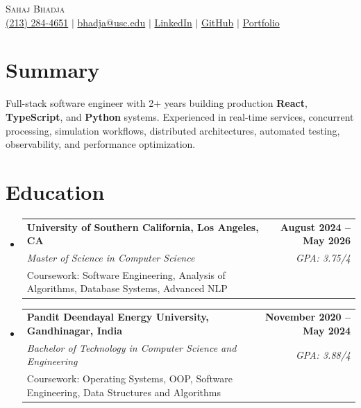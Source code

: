 \documentclass[letterpaper,10pt]{article}
\makeatletter
\newcommand{\resumeEduSubheading}[5]{\vspace{-1pt}\item\begin{tabular*}{1.0\textwidth}[t]{l@{\extracolsep{\fill}}r}\textbf{#1} & \textbf{\small #2} \\\textit{\small #3} & \textit{\small #4} \\\small #5 & \\\end{tabular*}\vspace{-4pt}}
\newcommand{\resumeSubHeadingListStart}{\begin{itemize}[leftmargin=0.0in,label={}]}
\newcommand{\resumeSubHeadingListEnd}{\end{itemize}}
\makeatother
\begin{document}
\begin{center}
  {\Huge \scshape Sahaj Bhadja} \\ \vspace{1pt}
  \small \href{tel:2132844651}{(213) 284-4651} $|$ \href{mailto:bhadja@usc.edu}{bhadja@usc.edu} $|$
  \href{https://www.linkedin.com/in/sahaj-bhadja/}{LinkedIn} $|$ \href{https://github.com/sahaj-bhadja}{GitHub} $|$ \href{https://sahaj-bhadja.github.io/}{Portfolio}
\end{center}
\vspace{-13pt}

\section{Summary}
\small Full-stack software engineer with 2+ years building production \textbf{React}, \textbf{TypeScript}, and \textbf{Python} systems. Experienced in real-time services, concurrent processing, simulation workflows, distributed architectures, automated testing, observability, and performance optimization.

\section{Education}
\resumeSubHeadingListStart
  \resumeEduSubheading{University of Southern California, Los Angeles, CA}{August 2024 -- May 2026}{Master of Science in Computer Science}{GPA: 3.75/4}{Coursework: Software Engineering, Analysis of Algorithms, Database Systems, Advanced NLP}
  \vspace{2pt}
  \resumeEduSubheading{Pandit Deendayal Energy University, Gandhinagar, India}{November 2020 -- May 2024}{Bachelor of Technology in Computer Science and Engineering}{GPA: 3.88/4}{Coursework: Operating Systems, OOP, Software Engineering, Data Structures and Algorithms}
\resumeSubHeadingListEnd
\end{document}
